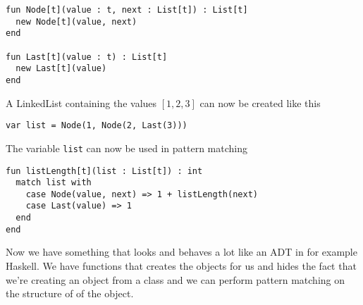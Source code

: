 \documentclass[10pt]{report}
\begin{document}
\begin{lstlisting}[language=encore,caption={Constructor functions for Node and Last}]
fun Node[t](value : t, next : List[t]) : List[t]
  new Node[t](value, next)
end

fun Last[t](value : t) : List[t]
  new Last[t](value)
end
\end{lstlisting}

A LinkedList containing the values $[1, 2, 3]$ can now be created like this
\begin{lstlisting}[language=encore,caption={Creation of list containing three elements}]
var list = Node(1, Node(2, Last(3)))
\end{lstlisting}

The variable \texttt{list} can now be used in pattern matching

\begin{lstlisting}[language=encore,caption={Function that uses pattern matching to calculate the length of a list}]
fun listLength[t](list : List[t]) : int
  match list with
    case Node(value, next) => 1 + listLength(next)
    case Last(value) => 1
  end
end
\end{lstlisting}

\par{\noindent Now we have something that looks and behaves a lot like an ADT in for example Haskell. We have functions that creates the objects for us and hides the fact that we're creating an object from a class and we can perform pattern matching on the structure of of the object.}
\end{document}

